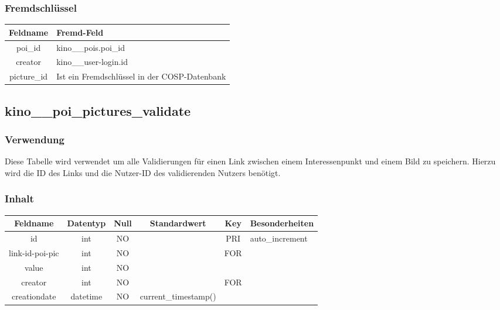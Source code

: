 \subsubsection{Fremdschlüssel}
\begin{table}[H]
	\begin{tabular}{|c|p{12.5cm}|}
		\hline
		\textbf{Feldname} & \textbf{Fremd-Feld} \\ \hline
		poi\_id & kino\_\_pois.poi\_id \\ \hline
		creator & kino\_\_user-login.id \\ \hline
		picture\_id & Ist ein Fremdschlüssel in der {\glqq COSP\grqq}-Datenbank \\ \hline
	\end{tabular}
\end{table}
\subsection{kino\_\_poi\_pictures\_validate}
\subsubsection{Verwendung} Diese Tabelle wird verwendet um alle Validierungen für einen Link zwischen einem Interessenpunkt und einem Bild zu speichern. Hierzu wird die ID des Links und die Nutzer-ID des validierenden Nutzers benötigt.
\subsubsection{Inhalt}
\begin{table}[H]
	\begin{tabular}{|c|c|c|c|c|p{3.5cm}|}
		\hline
		\textbf{Feldname} & \textbf{Datentyp} & \textbf{Null} & \textbf{Standardwert} & \textbf{Key}   & \textbf{Besonderheiten} \\ \hline
		id & int & NO &  & PRI & auto\_increment \\ \hline
		link-id-poi-pic & int & NO &  & FOR & \\ \hline
		value & int & NO &  &  & \\ \hline
		creator & int & NO &  & FOR & \\ \hline
		creationdate & datetime & NO & current\_timestamp() &  & \\ \hline
	\end{tabular}
\end{table}
